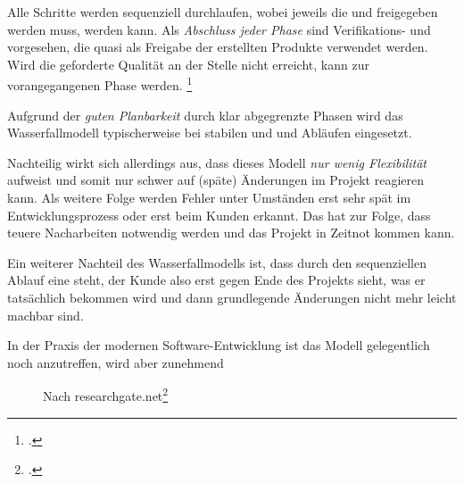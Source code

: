\documentclass{lehramt-informatik}
\begin{document}
Alle Schritte werden sequenziell durchlaufen, wobei jeweils die
 und freigegeben
werden muss,  werden kann. Als
\emph{Abschluss jeder Phase} sind Verifikations- und
 vorgesehen, die quasi als Freigabe der
erstellten Produkte verwendet werden. Wird die geforderte Qualität an
der Stelle nicht erreicht, kann zur vorangegangenen Phase
 werden.
\footcite[Seite 48]{schatten}

Aufgrund der \emph{guten Planbarkeit} durch klar abgegrenzte Phasen wird
das Wasserfallmodell typischerweise bei stabilen und  und Abläufen eingesetzt.

Nachteilig wirkt sich allerdings aus, dass dieses Modell \emph{nur wenig
Flexibilität} aufweist und somit nur schwer auf (späte) Änderungen im
Projekt reagieren kann. Als weitere Folge werden Fehler unter Umständen
erst sehr spät im Entwicklungsprozess oder erst beim Kunden erkannt. Das
hat zur Folge, dass teuere Nacharbeiten notwendig werden und das Projekt
in Zeitnot kommen kann.

Ein weiterer Nachteil des Wasserfallmodells ist, dass durch den
sequenziellen Ablauf eine  steht, der Kunde also erst gegen Ende des Projekts sieht,
was er tatsächlich bekommen wird und dann grundlegende Änderungen nicht
mehr leicht machbar sind.

In der Praxis der modernen Software-Entwicklung ist das Modell
gelegentlich noch anzutreffen, wird aber zunehmend 


\begin{figure}
\caption{Nach researchgate.net\footcite[Seite 26]{sosy:fs:1}}
\end{figure}
\end{document}
